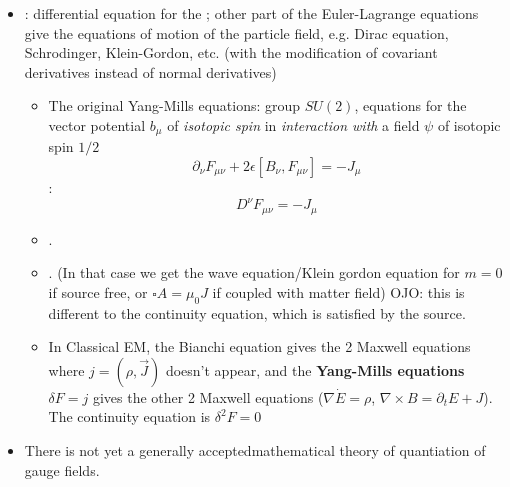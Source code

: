 \documentclass[12pt]{report}
\begin{document}
\begin{itemize}
    \item {}: differential equation for the ; other part of the Euler-Lagrange equations give the equations of motion of the particle field, e.g. Dirac equation, Schrodinger, Klein-Gordon, etc. (with the modification of covariant derivatives instead of normal derivatives)
    \begin{itemize}
        \item The original Yang-Mills equations: group $SU(2)$, equations for the vector potential $b_\mu$ of \emph{isotopic spin} in \emph{interaction with} a field $\psi$ of isotopic spin $1/2$ \[\partial_\nu F_{\mu \nu} + 2 \epsilon [B_\nu, F_{\mu \nu}] = -J_\mu\] :\[D^\nu F_{\mu \nu} = -J_\mu\] 
        
        \item {}.
        
        \item {}. (In that case we get the wave equation/Klein gordon equation for $m=0$ if source free, or $\square A = \mu_0 J$ if coupled with matter field) OJO: this is different to the continuity equation, which is satisfied by the source.
        
        \item In Classical EM, the Bianchi equation gives the 2 Maxwell equations where $j = (\rho, \vec J)$ doesn't appear, and the \textbf{Yang-Mills equations} $\delta F = j$ gives the other 2 Maxwell equations ($\nabla \dot E = \rho$, $\nabla \times B = \partial_t E + J$). The continuity equation is $\delta^2 F = 0$
    \end{itemize}
    
    \item There is not yet a generally acceptedmathematical theory of quantiation of gauge fields.
\end{itemize}
\end{document}
